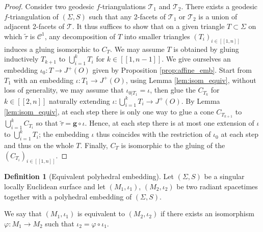 \documentclass[a4paper,12pt]{article}
\def\lsem{[\![}
\def\rsem{]\!]}
\def\TT{\mathcal T}
\def\quadform{\mathbf{g}}
\theoremstyle{definition}
\newtheorem{defi}[lem]{Definition}	%
\begin{document}
							\begin{proof}							 
							 Consider two geodesic $f$-triangulations $\TT_1$ and $\TT_2$. There exists a geodesic $f$-triangulation of $(\Sigma, S)$ such that any 2-facets of $\TT_1$ or  $\TT_2$ is a union of adjacent 2-facets of $\TT$. It thus suffices to show that 
							 on a given triangle $T\subset \Sigma$ on which $\widetilde\tau$ is $\mathscr C^1$, any decomposition of $T$ into smaller triangles $(T_i)_{i\in \lsem 1,n\rsem}$ induces a gluing isomorphic to $C_T$. We may assume $T$ is obtained by gluing inductively $T_{k+1}$ to $\bigcup_{i=1}^k T_i$ for $k\in \lsem 1,n-1\rsem$. We give ourselves an embedding $\iota_0: T \rightarrow J^+(O)$ given by Proposition \ref{prop:affine_emb}. Start from $T_{1}$ with an embedding $\iota:T_1\rightarrow J^+(O)$, using Lemma \ref{lem:isom_equiv}, without loss of generality, we may assume that $\iota_{0|T_1}=\iota$, then glue the $C_{T_k}$ for $k\in \lsem 2,n\rsem$ naturally extending $\iota:\bigcup_{i=1}^kT_i \rightarrow J^+(O)$. By Lemma \ref{lem:isom_equiv}, at each step there is only one way to glue a cone $C_{T_{k+1}}$ to $\bigcup_{i=1}^kC_{T_i}$ so that $\widetilde\tau = \quadform\circ \iota$. Hence, at each step there is at most one extension of $\iota$ to $\bigcup_{i=1}^kT_i$; the embedding $\iota$ thus coincides with the restriction of $\iota_0$ at each step and thus on the whole $T$. Finally, $C_T$ is isomorphic to the gluing of the $(C_{T_i})_{i\in\lsem 1,n\rsem}$.
							\end{proof}

					\begin{defi}[Equivalent polyhedral embedding] Let $(\Sigma, S)$ be a singular locally Euclidean surface and let $(M_1,\iota_1)$, $(M_2,\iota_2)$ be two radiant spacetimes together with a polyhedral embedding of $(\Sigma, S)$. 
					
					We say that $(M_1,\iota_1)$ is equivalent to $(M_2,\iota_2)$ if there exists an isomorphism $\varphi: M_1\rightarrow M_2$ such that $\iota_2 = \varphi \circ \iota_1$.
					 
					\end{defi}
					
\end{document}
